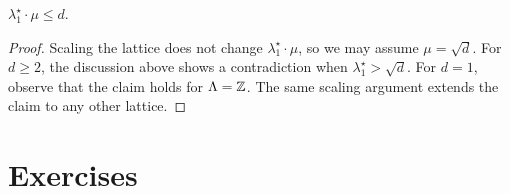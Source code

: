 \begin{theorem}
  \label{thm:transference-bound}
  $\lambda_1^\star \cdot \mu \leq d$.
\end{theorem}
\begin{proof}
  Scaling the lattice does not change $\lambda_1^\star \cdot \mu$,
  so we may assume $\mu = \sqrt{d}$.
  For $d \geq 2$, the discussion above shows a contradiction when $\lambda_1^\star > \sqrt{d}$.
  For $d = 1$, observe that the claim holds for $\Lambda = \mathbb{Z}$.
  The same scaling argument extends the claim to any other lattice.
\end{proof}










\section*{Exercises}


